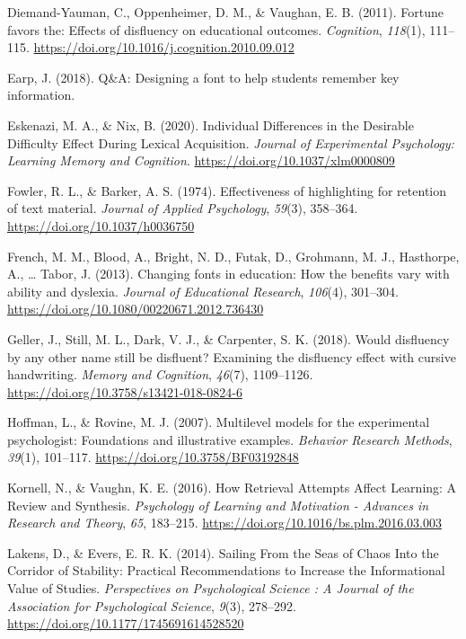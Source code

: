\documentclass[english,pdf]{apa6}
\begin{document}
\leavevmode\hypertarget{ref-Diemand-Yauman2011}{}%
Diemand-Yauman, C., Oppenheimer, D. M., \& Vaughan, E. B. (2011). Fortune favors the: Effects of disfluency on educational outcomes. \emph{Cognition}, \emph{118}(1), 111--115. \url{https://doi.org/10.1016/j.cognition.2010.09.012}

\leavevmode\hypertarget{ref-Earp2018}{}%
Earp, J. (2018). Q\&A: Designing a font to help students remember key information.

\leavevmode\hypertarget{ref-Eskenazi2020}{}%
Eskenazi, M. A., \& Nix, B. (2020). Individual Differences in the Desirable Difficulty Effect During Lexical Acquisition. \emph{Journal of Experimental Psychology: Learning Memory and Cognition}. \url{https://doi.org/10.1037/xlm0000809}

\leavevmode\hypertarget{ref-Fowler1974}{}%
Fowler, R. L., \& Barker, A. S. (1974). Effectiveness of highlighting for retention of text material. \emph{Journal of Applied Psychology}, \emph{59}(3), 358--364. \url{https://doi.org/10.1037/h0036750}

\leavevmode\hypertarget{ref-French2013}{}%
French, M. M., Blood, A., Bright, N. D., Futak, D., Grohmann, M. J., Hasthorpe, A., \ldots{} Tabor, J. (2013). Changing fonts in education: How the benefits vary with ability and dyslexia. \emph{Journal of Educational Research}, \emph{106}(4), 301--304. \url{https://doi.org/10.1080/00220671.2012.736430}

\leavevmode\hypertarget{ref-Geller2018}{}%
Geller, J., Still, M. L., Dark, V. J., \& Carpenter, S. K. (2018). Would disfluency by any other name still be disfluent? Examining the disfluency effect with cursive handwriting. \emph{Memory and Cognition}, \emph{46}(7), 1109--1126. \url{https://doi.org/10.3758/s13421-018-0824-6}

\leavevmode\hypertarget{ref-Hoffman2007}{}%
Hoffman, L., \& Rovine, M. J. (2007). Multilevel models for the experimental psychologist: Foundations and illustrative examples. \emph{Behavior Research Methods}, \emph{39}(1), 101--117. \url{https://doi.org/10.3758/BF03192848}

\leavevmode\hypertarget{ref-Kornell2016}{}%
Kornell, N., \& Vaughn, K. E. (2016). How Retrieval Attempts Affect Learning: A Review and Synthesis. \emph{Psychology of Learning and Motivation - Advances in Research and Theory}, \emph{65}, 183--215. \url{https://doi.org/10.1016/bs.plm.2016.03.003}

\leavevmode\hypertarget{ref-Lakens2014}{}%
Lakens, D., \& Evers, E. R. K. (2014). Sailing From the Seas of Chaos Into the Corridor of Stability: Practical Recommendations to Increase the Informational Value of Studies. \emph{Perspectives on Psychological Science : A Journal of the Association for Psychological Science}, \emph{9}(3), 278--292. \url{https://doi.org/10.1177/1745691614528520}
\end{document}
